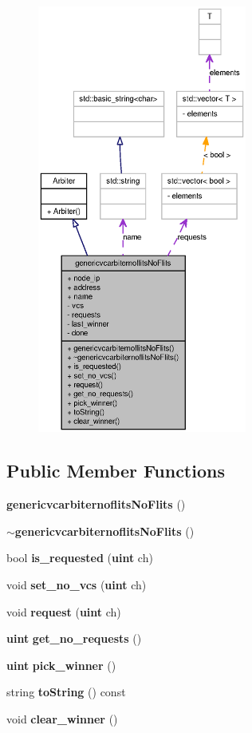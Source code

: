 \begin{figure}[H]
\begin{center}
\leavevmode
\includegraphics[height=400pt]{classgenericvcarbiternoflitsNoFlits__coll__graph}
\end{center}
\end{figure}
\subsection*{Public Member Functions}
\begin{CompactItemize}
\item 
{\bf genericvcarbiternoflitsNoFlits} ()
\item 
{\bf $\sim$genericvcarbiternoflitsNoFlits} ()
\item 
bool {\bf is\_\-requested} ({\bf uint} ch)
\item 
void {\bf set\_\-no\_\-vcs} ({\bf uint} ch)
\item 
void {\bf request} ({\bf uint} ch)
\item 
{\bf uint} {\bf get\_\-no\_\-requests} ()
\item 
{\bf uint} {\bf pick\_\-winner} ()
\item 
string {\bf toString} () const 
\item 
void {\bf clear\_\-winner} ()
\end{CompactItemize}

